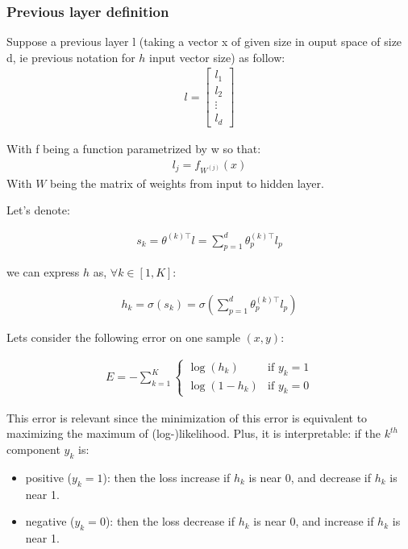 \subsubsection*{Previous layer definition}

Suppose a previous layer l (taking a vector x of given size in ouput space of size d, ie previous notation for $h$ input vector size) as follow:
\begin{align}
	l = 
	\begin{bmatrix} 
		l_1 \\
		l_2 \\
		\vdots \\
		l_d
	\end{bmatrix}
\end{align}


With f being a function parametrized by w so that:
\begin{align}
	l_j = f_{W^{(j)}}(x)
\end{align}
With $W$ being the matrix of weights from input to hidden layer.


Let's denote:

\begin{align}
	s_k  = \theta^{(k)\top} l = \sum_{p=1}^{d} \theta^{(k)\top}_p l_p 
\end{align}

we can express $h$ as, $\forall k \in [1, K]$:

\begin{align}
	h_k  = \sigma(s_k) = \sigma( \sum_{p=1}^{d} \theta^{(k)\top}_p l_p) 
\end{align}

Lets consider the following error on one sample $(x, y)$:

\begin{align}
	E = - \sum_{k=1}^K
  			  	\left\{
				    \begin{array}{ll}
				        \log (h_k) & \mbox{if } y_k =1 \\
				        \log (1 - h_k) & \mbox{if } y_k =0
				    \end{array}
				\right.
\end{align}

This error is relevant since the minimization of this error is equivalent to maximizing the maximum of (log-)likelihood.
Plus, it is interpretable: if the $k^{th}$ component $y_k$ is:
\begin{itemize}
	\item positive ($y_k=1$): then the loss increase if $h_k$ is near 0, and decrease if $h_k$ is near 1.
	\item negative ($y_k=0$): then the loss decrease if $h_k$ is near 0, and increase if $h_k$ is near 1.
\end{itemize}



